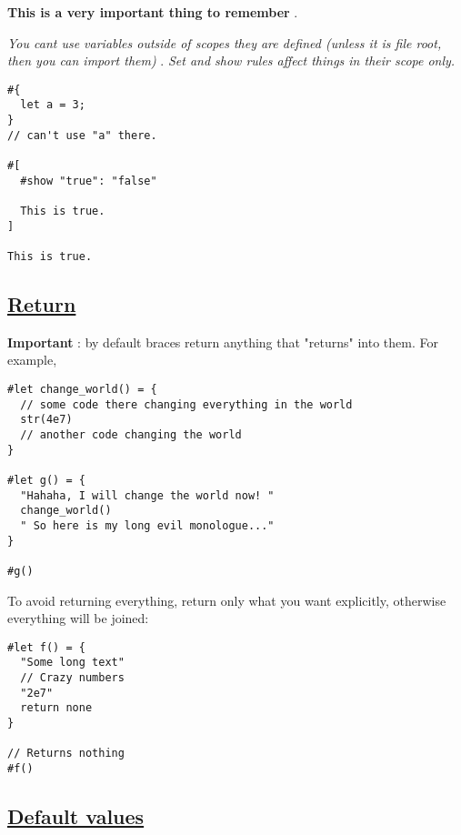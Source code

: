 \textbf{This is a very important thing to remember} .

\emph{You can\textquotesingle t use variables outside of scopes they are
defined (unless it is file root, then you can import them)} . \emph{Set
and show rules affect things in their scope only.}

\begin{verbatim}
#{
  let a = 3;
}
// can't use "a" there.

#[
  #show "true": "false"

  This is true.
]

This is true.
\end{verbatim}

\pandocbounded{}

\subsection{\texorpdfstring{\hyperref[return]{Return}}{Return}}\label{return}

\textbf{Important} : by default braces return anything that "returns"
into them. For example,

\begin{verbatim}
#let change_world() = {
  // some code there changing everything in the world
  str(4e7)
  // another code changing the world
}

#let g() = {
  "Hahaha, I will change the world now! "
  change_world()
  " So here is my long evil monologue..."
}

#g()
\end{verbatim}

\pandocbounded{}

To avoid returning everything, return only what you want explicitly,
otherwise everything will be joined:

\begin{verbatim}
#let f() = {
  "Some long text"
  // Crazy numbers
  "2e7"
  return none
}

// Returns nothing
#f()
\end{verbatim}

\pandocbounded{}

\subsection{\texorpdfstring{\hyperref[default-values]{Default
values}}{Default values}}\label{default-values}

